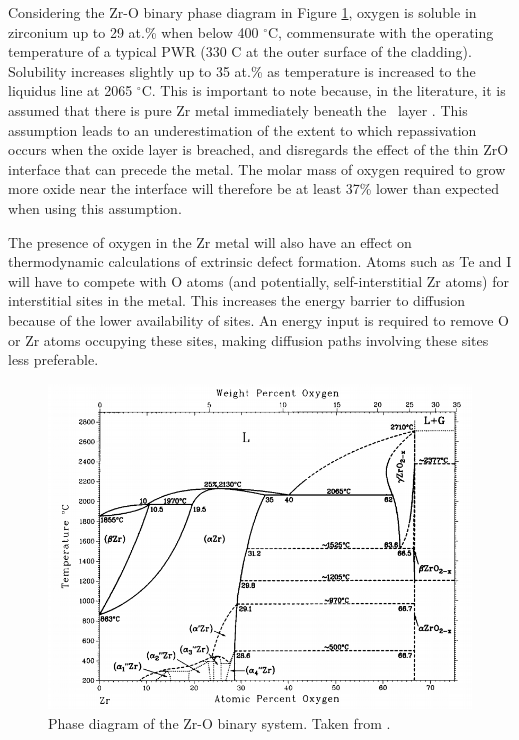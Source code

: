 Considering the Zr-O binary phase diagram in Figure \ref{figure:binary_phase_diagram}, oxygen is soluble in zirconium up to 29 at.\% when below 400 $^{\circ}$C, commensurate with the operating temperature of a typical PWR (330 \textdegree C at the outer surface of the cladding). Solubility increases slightly up to 35 at.\% as temperature is increased to the liquidus line at 2065 $^{\circ}$C. This is important to note because, in the literature, it is assumed that there is pure Zr metal immediately beneath the \zirconia\ layer \cite{rossi2015first}. This assumption leads to an underestimation of the extent to which repassivation occurs when the oxide layer is breached, and disregards the effect of the thin ZrO interface that can precede the metal. The molar mass of oxygen required to grow more oxide near the interface will therefore be at least 37\% lower than expected when using this assumption.

The presence of oxygen in the Zr metal will also have an effect on thermodynamic calculations of extrinsic defect formation. Atoms such as Te and I will have to compete with O atoms (and potentially, self-interstitial Zr atoms) for interstitial sites in the metal. This increases the energy barrier to diffusion because of the lower availability of sites. An energy input is required to remove O or Zr atoms occupying these sites, making diffusion paths involving these sites less preferable.


\begin{figure}[ht]
\centering
\includegraphics[width=14cm]{images/zro2_binary_phase.png}
\caption[Phase diagram of the Zr-O binary system.]{Phase diagram of the Zr-O binary system. Taken from \cite{Abriata1986}.}
\label{figure:binary_phase_diagram}
\end{figure}

